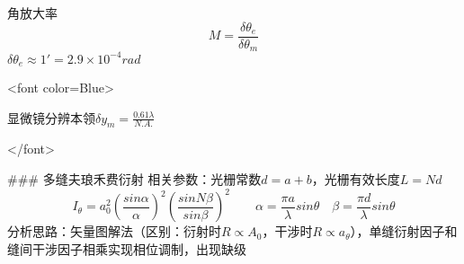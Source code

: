 \documentclass[12pt]{ctexart}
\begin{document}
角放大率
$$M=\frac{\delta\theta_e}{\delta\theta_m}$$
$\delta\theta_e\approx1'=2.9\times10^{-4}rad$

<font color=Blue>

显微镜分辨本领$\delta y_m=\frac{0.61\lambda}{N.A.}$

</font>

### 多缝夫琅禾费衍射
相关参数：光栅常数$d=a+b$，光栅有效长度$L=Nd$
$$I_\theta=a_0^2(\frac{sin\alpha}{\alpha})^2(\frac{sinN\beta}{sin\beta})^2\qquad \alpha=\frac{\pi a}{\lambda}sin\theta\quad\beta=\frac{\pi d}{\lambda}sin\theta$$
分析思路：矢量图解法（区别：衍射时$R\propto A_0$，干涉时$R\propto a_\theta$），单缝衍射因子和缝间干涉因子相乘实现相位调制，出现缺级

\label{unknown}
\end{document}
